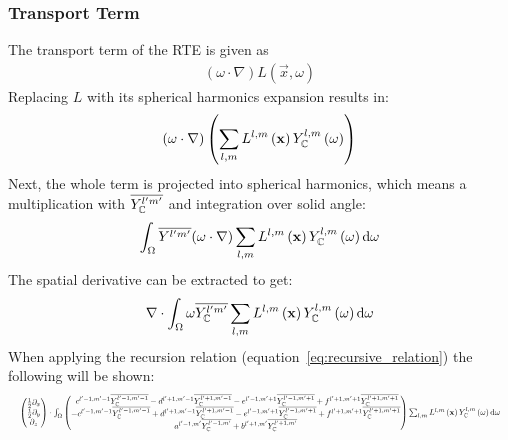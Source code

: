 \subsubsection*{Transport Term}
The transport term of the RTE is given as
\begin{align*}
(\omega\cdot\nabla)L(\vec{x}, \omega)
\end{align*}
Replacing $L$ with its spherical harmonics expansion results in:
\begin{align*}
\left(\omega\cdot\nabla\right)
\left(
\sum_{l,m}
{
L^{l,m}\left(\mathbf{x}\right )
Y_{\mathbb{C}}^{l,m}\left(\omega\right)
}
\right)
\end{align*}
Next, the whole term is projected into spherical harmonics, which means a multiplication with $\overline{Y_{\mathbb{C}}^{l'm'}}$ and integration over solid angle:
\begin{align*}
\int_\Omega
{
\overline{Y^{l'm'}}(\omega\cdot\nabla)
\sum_{l,m}
{
L^{l,m}\left(\mathbf{x}\right)
Y_{\mathbb{C}}^{l,m}\left(\omega\right)
}
}
\,\mathrm{d}\omega
\end{align*}
The spatial derivative can be extracted to get:
\begin{align*}
\nabla\cdot\int_\Omega
{
\omega\overline{Y_{\mathbb{C}}^{l'm'}}
\sum_{l,m}
{
L^{l,m}\left(\mathbf{x}\right)
Y_{\mathbb{C}}^{l,m}\left(\omega\right)
}
\,\mathrm{d}\omega
}
\end{align*}
When applying the recursion relation (equation~\ref{eq:recursive_relation}) the following will be shown:
\begin{equation*}
\resizebox{1.0\hsize}{!}{$
\begin{pmatrix}
\frac{1}{2}\partial_x\\
\frac{i}{2}\partial_y\\
\partial_z
\end{pmatrix}
\cdot
\int_\Omega
\begin{pmatrix}
\ c^{l'-1, m'-1}\overline{\SHBC^{l'-1,m'-1}} - d^{l'+1, m'-1}\overline{\SHBC^{l'+1,m'-1}} - e^{l'-1, m'+1}\overline{\SHBC^{l'-1,m'+1}} + f^{l'+1, m'+1}\overline{\SHBC^{l'+1,m'+1}}\\
-c^{l'-1, m'-1}\overline{\SHBC^{l'-1,m'-1}} + d^{l'+1, m'-1}\overline{\SHBC^{l'+1,m'-1}} - e^{l'-1, m'+1}\overline{\SHBC^{l'-1,m'+1}} + f^{l'+1, m'+1}\overline{\SHBC^{l'+1,m'+1}} \\
a^{l'-1, m'}\overline{\SHBC^{l'-1,m'}}+b^{l'+1, m'}\overline{\SHBC^{l'+1,m'}}
\end{pmatrix}
\sum_{l,m}{
L^{l,m}\left(\vec{x}\right )\SHBC^{l,m}\left(\omega\right)
}
\ud\omega
$}
\end{equation*}
